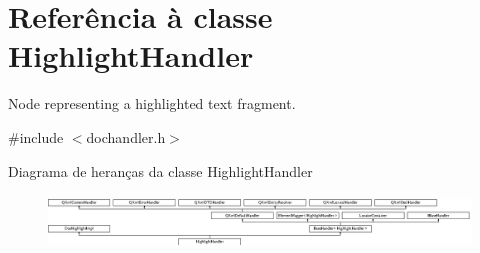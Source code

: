 \hypertarget{class_highlight_handler}{\section{Referência à classe Highlight\-Handler}
\label{class_highlight_handler}
}


Node representing a highlighted text fragment.  




{\ttfamily \#include $<$dochandler.\-h$>$}

Diagrama de heranças da classe Highlight\-Handler\begin{figure}[H]
\begin{center}
\leavevmode
\includegraphics[height=1.415929cm]{class_highlight_handler}
\end{center}
\end{figure}
